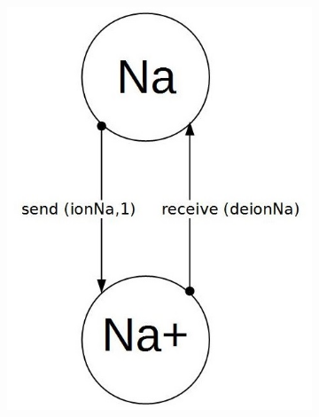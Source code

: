 \documentclass[11pt]{report}
\begin{document}
\begin{figure}[!h]
\begin{subfigure}[b]{0.3\textwidth}
        \includegraphics[width=\textwidth]{Na.jpg}
    \end{subfigure}
    \begin{subfigure}[b]{0.3\textwidth}

\end{subfigure}
\end{figure}
\end{document}
